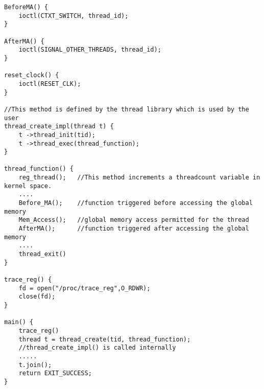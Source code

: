 \begin{lstlisting}[title=User Space Implementation, style=customc]
BeforeMA() {	
	ioctl(CTXT_SWITCH, thread_id);	
}

AfterMA() {	
	ioctl(SIGNAL_OTHER_THREADS, thread_id);
}

reset_clock() {
	ioctl(RESET_CLK);
}

//This method is defined by the thread library which is used by the user
thread_create_impl(thread t) {
	t ->thread_init(tid);
	t ->thread_exec(thread_function);
}

thread_function() {
	reg_thread();	//This method increments a threadcount variable in kernel space.
	....	
	Before_MA(); 	//function triggered before accessing the global memory
	Mem_Access();   //global memory access permitted for the thread
	AfterMA();		//function triggered after accessing the global memory		
	....
	thread_exit()
}

trace_reg() {	
	fd = open("/proc/trace_reg",O_RDWR);
	close(fd);	
}

main() {	
	trace_reg()
	thread t = thread_create(tid, thread_function); 
	//thread_create_impl() is called internally
	.....
	t.join();	
	return EXIT_SUCCESS;
}


\end{lstlisting}

